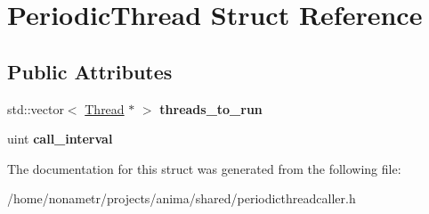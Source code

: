 \hypertarget{structPeriodicThread}{
\section{PeriodicThread Struct Reference}
\label{structPeriodicThread}
}
\subsection*{Public Attributes}
\begin{DoxyCompactItemize}
\item 
\hypertarget{structPeriodicThread_acede129e7cdac21b9c693663ecd8cce8}{
std::vector$<$ \hyperlink{classThread}{Thread} $\ast$ $>$ {\bfseries threads\_\-to\_\-run}}
\label{structPeriodicThread_acede129e7cdac21b9c693663ecd8cce8}

\item 
\hypertarget{structPeriodicThread_a3abca614693acac7690c25795da551df}{
uint {\bfseries call\_\-interval}}
\label{structPeriodicThread_a3abca614693acac7690c25795da551df}

\end{DoxyCompactItemize}


The documentation for this struct was generated from the following file:\begin{DoxyCompactItemize}
\item 
/home/nonametr/projects/anima/shared/periodicthreadcaller.h\end{DoxyCompactItemize}
